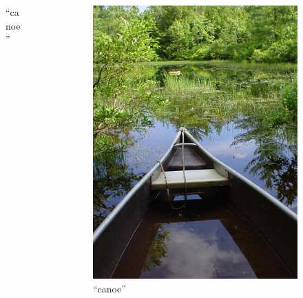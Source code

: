 \documentclass{beamer}
\begin{document}
\begin{frame}
\begin{columns}
\begin{column}{.3\textwidth}
\begin{figure}
\caption{``canoe''}
\end{figure}
\end{column}
\begin{column}{.3\textwidth}
\begin{figure}
\includegraphics[width=\textwidth]{n02951358_588}
\caption{``canoe''}
\end{figure}
\end{column}
\end{columns}
\end{frame}
\end{document}
